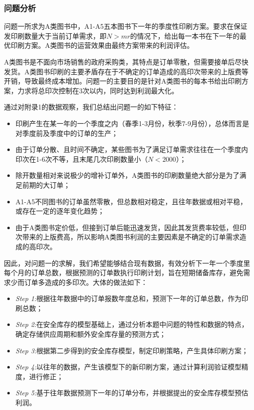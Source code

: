 \documentclass[bwprint]{gmcmthesis}
\begin{document}
\subsubsection{问题分析}

问题一所求为A类图书中，A1-A5五本图书下一年的季度性印刷方案。要求在保证发印刷数量大于当前订单需求，即$N>mr$的情况下，给出每一本书在下一年的最优印刷方案。A类图书的运营效果由最终方案带来的利润评估。

A类图书是不面向市场销售的政府采购类，其特点是订单零散，但需要接单后尽快发货。A类图书印刷的主要矛盾存在于不确定的订单造成的高印次带来的上版费等开销，导致最终成本增加。问题一的主要目的是针对A类图书的每本书给出印刷方案，力求将总印次控制在3次以内，同时达到利润最大化。

通过对附录1的数据观察，我们总结出问题一的如下特征：
\begin{itemize}
  \item 印刷产生在某一年的一个季度之内（春季1-3月份，秋季7-9月份），总体而言是对季度前及季度中的订单的生产；
  \item 由于订单分散、且时间不确定，某些图书为了满足订单需求往往在一个季度内印次在1-6次不等，且末尾几次印刷数量小（$N<2000$）；
  \item 除开数量相对来说极少的增补订单外，A类图书的印刷数量绝大部分是为了满足前期的大订单；
  \item A1-A5不同图书的订单虽然零散，但总数相对稳定，且往年数据或相对平稳，或存在一定的逐年变化趋势；
  \item 由于A类图书定价低，但接到订单后能迅速发货，因此其发货费率较低，但印次带来的上版费高，所以影响A类图书利润的主要因素是不确定的订单需求造成的高印次。
\end{itemize}

因此，对问题一的求解，我们希望能够结合现有数据，有效分析下一年一个季度里每个月的订单总数，根据预测的订单数执行印刷计划，旨在短期储备库存，避免需求少而订单多造成的多印次。大体的做法如下：
\begin{itemize}
  \item \emph{Step 1:}根据往年数据中的订单报数年度总和，预测下一年的订单总数，作为印刷总数；
  \item \emph{Step 2:}在安全库存的模型基础上，通过分析本题中问题的特性和数据的特点，确定存储供应周期和额外安全库存量的预测方式；
  \item \emph{Step 3:}根据第二步得到的安全库存模型，制定印刷策略，产生具体印刷方案；
  \item \emph{Step 4:}以往年的数据，产生该模型下的新印刷方案，通过计算利润验证模型精度，进行修正；
  \item \emph{Step 5:}基于往年数据预测下一年的订单分布，并根据提出的安全库存模型预估利润。
\end{itemize}
\end{document}
